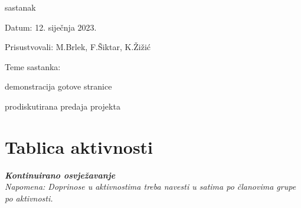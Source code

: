 \begin{packed_enum}
			\item  sastanak 
			\item[] \begin{packed_item}
				\item Datum: 12. siječnja 2023.
				\item Prisustvovali: M.Brlek, F.Šiktar, K.Žižić
				\item Teme sastanka:
				\begin{packed_item}
					\item demonstracija gotove stranice
					\item prodiskutirana predaja projekta
				\end{packed_item}
			\end{packed_item}
			
			
		\end{packed_enum}
		
		\eject
		\section*{Tablica aktivnosti}
		
			\textbf{\textit{Kontinuirano osvježavanje}}\\
			
			 \textit{Napomena: Doprinose u aktivnostima treba navesti u satima po članovima grupe po aktivnosti.}

